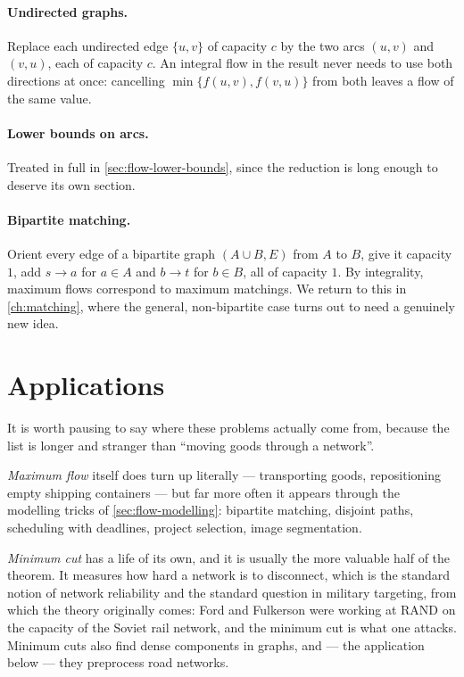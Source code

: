 \paragraph{Undirected graphs.}
Replace each undirected edge $\{u,v\}$ of capacity $c$ by the two arcs $(u,v)$
and $(v,u)$, each of capacity $c$. An integral flow in the result never needs
to use both directions at once: cancelling $\min\{f(u,v), f(v,u)\}$ from both
leaves a flow of the same value.

\paragraph{Lower bounds on arcs.}
Treated in full in \cref{sec:flow-lower-bounds}, since the reduction is long
enough to deserve its own section.

\paragraph{Bipartite matching.}
Orient every edge of a bipartite graph $(A \cup B, E)$ from $A$ to $B$, give it
capacity $1$, add $s \to a$ for $a \in A$ and $b \to t$ for $b \in B$, all of
capacity $1$. By integrality, maximum flows correspond to maximum matchings.
We return to this in \cref{ch:matching}, where the general, non-bipartite case
turns out to need a genuinely new idea.

\section{Applications}
\label{sec:flow-applications}

It is worth pausing to say where these problems actually come from, because the
list is longer and stranger than ``moving goods through a network''.

\emph{Maximum flow} itself does turn up literally --- transporting goods,
repositioning empty shipping containers --- but far more often it appears
through the modelling tricks of \cref{sec:flow-modelling}: bipartite matching,
disjoint paths, scheduling with deadlines, project selection, image
segmentation.

\emph{Minimum cut} has a life of its own, and it is usually the more valuable
half of the theorem. It measures how hard a network is to disconnect, which is
the standard notion of network reliability and the standard question in
military targeting, from which the theory originally comes: Ford and Fulkerson
were working at RAND on the capacity of the Soviet rail network, and the
minimum cut is what one attacks. Minimum cuts also find dense components in
graphs, and --- the application below --- they preprocess road networks.

